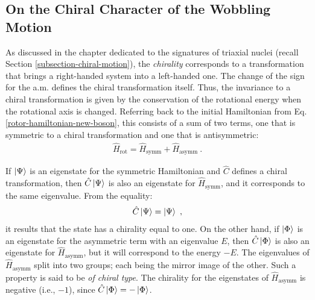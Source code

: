 \subsection{On the Chiral Character of the Wobbling Motion}
\label{new-boson-chiral-character}

As discussed in the chapter dedicated to the signatures of triaxial nuclei (recall Section \ref{subsection-chiral-motion}), the \emph{chirality} corresponds to a transformation that brings a right-handed system into a left-handed one. The change of the sign for the a.m. defines the chiral transformation itself. Thus, the invariance to a chiral transformation is given by the conservation of the rotational energy when the rotational axis is changed. Referring back to the initial Hamiltonian from Eq. \ref{rotor-hamiltonian-new-boson}, this consists of a sum of two terms, one that is symmetric to a chiral transformation and one that is antisymmetric:
\begin{align}
    \hat{H}_\text{rot}=\hat{H}_\text{symm}+\hat{H}_\text{asymm}\ .
\end{align}

If $\ket{\Psi}$ is an eigenstate for the symmetric Hamiltonian and $\hat{C}$ defines a chiral transformation, then $\hat{C}\ket{\Psi}$ is also an eigenstate for $\hat{H}_\text{symm}$, and it corresponds to the same eigenvalue. From the equality:
\begin{align}
    \hat{C}\ket{\Psi}=\ket{\Psi}\ ,
\end{align}
it results that the state has a chirality equal to one. On the other hand, if $\ket{\Phi}$ is an eigenstate for the asymmetric term with an eigenvalue $E$, then $\hat{C}\ket{\Phi}$ is also an eigenstate for $\hat{H}_\text{asymm}$, but it will correspond to the energy $-E$. The eigenvalues of $\hat{H}_\text{asymm}$ split into two groups; each being the mirror image of the other. Such a property is said to be \emph{of chiral type}. The chirality for the eigenstates of $\hat{H}_\text{asymm}$ is negative (i.e., $-1$), since $\hat{C}\ket{\Phi}=-\ket{\Phi}$.

